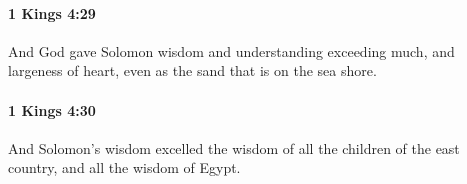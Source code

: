 		\paragraph{1 Kings 4:29} %
			\label{1KINGS-4-29}

			And God gave Solomon wisdom and understanding exceeding much, and largeness of heart, even as the sand that is on the sea shore.


		\paragraph{1 Kings 4:30} %
			\label{1KINGS-4-30}

			And Solomon’s wisdom excelled the wisdom of all the children of the east country, and all the wisdom of Egypt.


